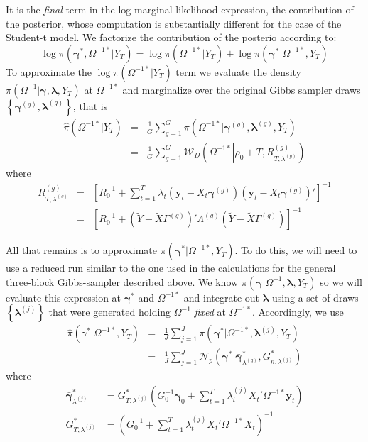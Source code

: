 \documentclass[12pt]{article}
\begin{document}
It is the \emph{final} term in the log marginal likelihood expression, the contribution of the posterior, whose computation is substantially different for the case of the Student-t model.
We factorize the contribution of the posterio according to:
\begin{equation*}
\log \pi(\boldsymbol{\gamma}^*, \Omega^{-1*}|Y_T) =  \log \pi\left( \Omega^{-1*}|Y_T \right) + \log \pi\left( \boldsymbol{\gamma}^*|\Omega^{-1*},Y_T \right) 
\end{equation*}
To approximate the $\log \pi(\Omega^{-1*}|Y_T)$ term we evaluate the density $\pi(\Omega^{-1}|\boldsymbol{\gamma},\boldsymbol{\lambda},Y_T)$ at $\Omega^{-1*}$ and marginalize over the original Gibbs sampler draws $\left\{ \boldsymbol{\gamma}^{(g)}, \boldsymbol{\lambda}^{(g)} \right\}$, that is
\begin{eqnarray*}
	\widehat{\pi}\left( \Omega^{-1*}|Y_T \right) &=& \frac{1}{G}\sum_{g=1}^G \pi\left( \Omega^{-1*}|\boldsymbol{\gamma}^{(g)},\boldsymbol{\lambda}^{(g)},Y_T \right)\\
	&=& \frac{1}{G}\sum_{g=1}^G \mathcal{W}_D\left(\Omega^{-1*}\left|\rho_0 + T, R_{T,\lambda^{(g)}}^{\left( g \right)}\right. \right) 
\end{eqnarray*}
where
\begin{eqnarray*}
	R^{(g)}_{T,\lambda^{(g)}} &=&  \left[ R_0^{-1} + \sum_{t=1}^{T} \lambda_t \left( \mathbf{y}_t - X_t \boldsymbol{\gamma}^{(g)} \right)\left( \mathbf{y}_t - X_t \boldsymbol{\gamma}^{(g)} \right)' \right]^{-1}\\
	&=& \left[  R_0^{-1} + \left( \widetilde{Y} - \widetilde{X} \Gamma^{(g)} \right)' \Lambda^{(g)}\left( \widetilde{Y} - \widetilde{X} \Gamma^{(g)} \right)\right]^{-1}
\end{eqnarray*}

All that remains is to approximate $\pi\left( \boldsymbol{\gamma}^*|\Omega^{-1*}, Y_T \right)$.
To do this, we will need to use a reduced run similar to the one used in the calculations for the general three-block Gibbs-sampler described above.
We know $\pi\left( \boldsymbol{\gamma}|\Omega^{-1}, \boldsymbol{\lambda},Y_T \right)$ so we will evaluate this expression at $\boldsymbol{\gamma}^*$ and $\Omega^{-1*}$ and integrate out $\boldsymbol{\lambda}$ using a set of draws $\left\{ \boldsymbol{\lambda}^{(j)} \right\}$ that were generated holding $\Omega^{-1}$ \emph{fixed} at $\Omega^{-1*}$.
Accordingly, we use
\begin{eqnarray*}
	\widehat{\pi} (\gamma^*|\Omega ^{-1*},Y_T)&=& \frac{1}{J} \sum_{j=1}^{J}\pi\left( \boldsymbol{\gamma}^{*}|\Omega^{-1*}, \boldsymbol{\lambda}^{(j)},Y_T \right)\\
	&=& \frac{1}{J} \sum_{j=1}^{J}\mathcal{N}_{p}\left( \boldsymbol{\gamma}^*|\bar{\boldsymbol{\gamma}}_{\lambda ^{(g)}}^{\ast },G_{n,\lambda ^{(j)}}^* \right)
\end{eqnarray*}
where
\begin{align*}
\bar{\boldsymbol{\gamma}}_{\lambda^{(j)}}^* &= G_{T,\lambda^{(j)}}^*\left(
G_0^{-1}\boldsymbol{\gamma}_0 +\sum_{t=1}^{T}\lambda_{t}^{(j)}X_t'\Omega^{-1*}\mathbf{y}_t\right)  \\
G_{T,\lambda ^{(j)}}^* & =\left( G_{0}^{-1}+\sum_{t=1}^{T}\lambda
_{t}^{(j)}X_t'\Omega^{-1*}X_t\right) ^{-1}
\end{align*}
\end{document}
